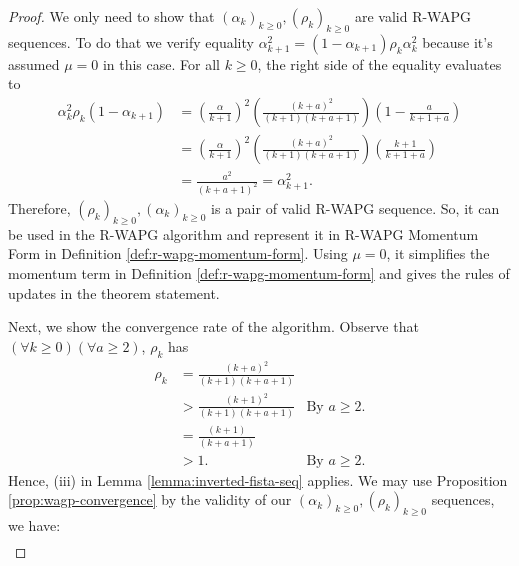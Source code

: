 \documentclass[12pt]{article}
\begin{document}
    \begin{proof}
        We only need to show that $(\alpha_k)_{k \ge 0}, (\rho_k)_{k \ge 0}$ are valid R-WAPG sequences. 
        To do that we verify equality $\alpha_{k + 1}^2 = (1 - \alpha_{k + 1})\rho_k \alpha_k^2$ because it's assumed $\mu = 0$ in this case. 
        For all $k \ge 0$, the right side of the equality evaluates to 
        \begin{align*}
            \alpha_k^2 \rho_k(1 - \alpha_{k + 1}) &= 
            \left(
                \frac{\alpha}{k + 1}
            \right)^2 \left(
                \frac{(k + a)^2}{(k + 1)(k + a + 1)}
            \right)
            \left(
                1 - \frac{a}{k + 1 + a}
            \right)
            \\
            &= \left(
                \frac{\alpha}{k + 1}
            \right)^2 \left(
                \frac{(k + a)^2}{(k + 1)(k + a + 1)}
            \right)
            \left(
                \frac{k + 1}{k + 1 + a}
            \right)
            \\
            &= \frac{a^2}{(k + a + 1)^2} = \alpha_{k + 1}^2. 
        \end{align*}
        Therefore, $(\rho_k)_{k \ge 0}, (\alpha_k)_{k \ge 0}$ is a pair of valid R-WAPG sequence. 
        So, it can be used in the R-WAPG algorithm and represent it in R-WAPG Momentum Form in Definition \ref{def:r-wapg-momentum-form}. 
        Using $\mu = 0$, it simplifies the momentum term in Definition \ref{def:r-wapg-momentum-form} and gives the rules of updates in the theorem statement. 
        \par
        Next, we show the convergence rate of the algorithm. 
        Observe that $(\forall k \ge 0)(\forall a \ge 2)$, $\rho_k$ has 
        \begin{align*}
            \rho_k &= \frac{(k + a)^2}{(k + 1)(k + a + 1)} 
            \\
            &> \frac{(k + 1)^2}{(k + 1)(k + a + 1)} 
            & \text{By } a \ge 2. 
            \\
            &= \frac{(k + 1)}{(k + a + 1)} 
            \\
            & > 1.   & \text{By } a \ge 2. 
        \end{align*}
        Hence, (iii) in Lemma \ref{lemma:inverted-fista-seq} applies. 
        We may use Proposition \ref{prop:wagp-convergence} by the validity of our $(\alpha_k)_{k \ge0}, (\rho_k)_{k \ge 0}$ sequences, we have:
        {\small\begin{align*}

\end{align*}}
\end{proof}
\end{document}
